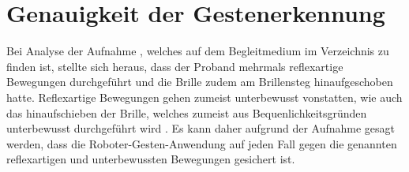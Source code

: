 \section{Genauigkeit der Gestenerkennung}
Bei Analyse der Aufnahme , welches auf dem Begleitmedium im Verzeichnis  zu finden ist, stellte sich heraus, dass der Proband mehrmals reflexartige Bewegungen durchgeführt und die Brille zudem am Brillensteg hinaufgeschoben hatte. Reflexartige Bewegungen gehen zumeist unterbewusst vonstatten, wie auch das hinaufschieben der Brille, welches zumeist aus Bequenlichkeitsgründen unterbewusst durchgeführt wird \cite{matschnig_glossar_nodate}. Es kann daher aufgrund der Aufnahme gesagt werden, dass die Roboter-Gesten-Anwendung auf jeden Fall gegen die genannten reflexartigen und unterbewussten Bewegungen gesichert ist.
